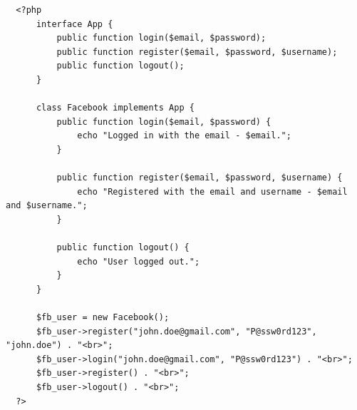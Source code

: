 \documentclass{article}
\begin{document}
\begin{verbatim}
  <?php
      interface App {
          public function login($email, $password);
          public function register($email, $password, $username); 
          public function logout(); 
      }

      class Facebook implements App {
          public function login($email, $password) {
              echo "Logged in with the email - $email.";
          }

          public function register($email, $password, $username) {
              echo "Registered with the email and username - $email and $username.";
          }

          public function logout() {
              echo "User logged out.";
          }
      }

      $fb_user = new Facebook();
      $fb_user->register("john.doe@gmail.com", "P@ssw0rd123", "john.doe") . "<br>";
      $fb_user->login("john.doe@gmail.com", "P@ssw0rd123") . "<br>";
      $fb_user->register() . "<br>";
      $fb_user->logout() . "<br>"; 
  ?>
\end{verbatim}
\end{document}

